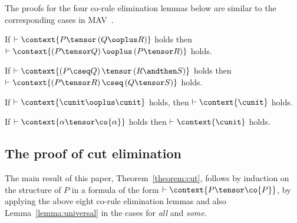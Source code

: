 \documentclass[UKenglish,acmsmall,authorversion]{acmart}
\theoremstyle{plain}
\begin{document}
The proofs for the four co-rule elimination lemmas below are similar to the corresponding cases in \textsf{MAV}~\cite{Horne2015}.
%
\begin{lemma}[co-external]
\label{lemma:co-external}
If $\vdash \context{ P \tensor  \left( Q \ooplus R \right) }$ holds
 then $\vdash \context{ \left( P \tensor Q \right) \ooplus \left( P \tensor R \right) }$ holds.
\end{lemma}

\begin{lemma}[co-sequence]
\label{lemma:co-sequence}
If $\vdash \context{ \left( P \cseq Q \right) \tensor \left( R \andthen S \right) }$ holds
 then $\vdash \context{ \left( P \tensor R \right) \cseq \left( Q \tensor S \right) }$ holds.
\end{lemma}

%
\begin{lemma}[co-tidy]
\label{lemma:co-tidy}
If $\vdash \context{ \cunit \ooplus \cunit }$ holds, then $\vdash \context{ \cunit }$ holds.
\end{lemma}

\begin{lemma}
\label{lemma:co-atoms}
If $\vdash \context{ \alpha \tensor \co{\alpha} }$ holds
then $\vdash \context{ \cunit }$ holds.
\end{lemma}


\subsection{The proof of cut elimination}
The main result of this paper, Theorem~\ref{theorem:cut}, follows by induction on the structure of $P$ in a formula of the form $\vdash \context{ P \tensor \co{P} }$, by applying the above eight co-rule elimination lemmas and also Lemma~\ref{lemma:universal} in the cases for \textit{all} and \textit{some}.
\end{document}
